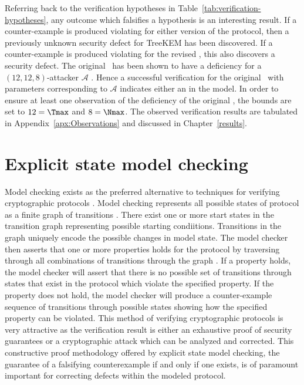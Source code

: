 Referring back to the verification hypotheses in Table\ \ref{tab:verification-hypotheses}, any outcome which falsifies a hypothesis is an interesting result.
If a counter-example is produced violating  for either version of the protocol, then a previously unknown security defect for TreeKEM has been discovered.
If a counter-example is produced violating  for the revised \VersionTwo, this also discovers a security defect.
The original \VersionOne\ has been shown to have a  deficiency for a \((12, 12, 8)\)-attacker \(\mathcal{A}\) \autocite{alwen2020security}.
Hence a successful  verification for the original \VersionOne\ with parameters corresponding to \(\mathcal{A}\) indicates either an in the model.
In order to ensure at least one observation of the  deficiency of the original \VersionOne, the bounds are set to \(12 = \Tmax\) and \(8 = \Nmax\).
The observed verification results are tabulated in Appendix\ \ref{apx:Observations} and discussed in Chapter\ \ref{results}.


\hypertarget{sec:explicit-state-model-checking}{%
\section{Explicit state model checking}\label{sec:explicit-state-model-checking}}

Model checking exists as the preferred alternative to  techniques for verifying cryptographic protocols \autocite{kacprzak2006comparing, lomuscio2007verification, van2004symbolic}.
Model checking represents all possible states of protocol as a finite graph of transitions \autocite{clarke1981design}.
There exist one or more start states in the transition graph representing possible starting condiitions.
Transitions in the graph uniquely encode the possible changes in model state.
The model checker then asserts that one or more properties holds for the protocol by traversing through all combinations of transitions through the graph \autocite{Vardi1986}.
If a property holds, the model checker will assert that there is no possible set of transitions through states that exist in the protocol which violate the specified property.
If the property does not hold, the model checker will produce a counter-example sequence of transitions through possible states showing how the specified property can be violated.
This method of verifying cryptographic protocols is very attractive as the verification result is either an exhaustive proof of security guarantees or a cryptographic attack which can be analyzed and corrected.
This constructive proof methodology offered by explicit state model checking, the guarantee of a falsifying counterexample if and only if one exists, is of paramount important for correcting defects within the modeled protocol.

